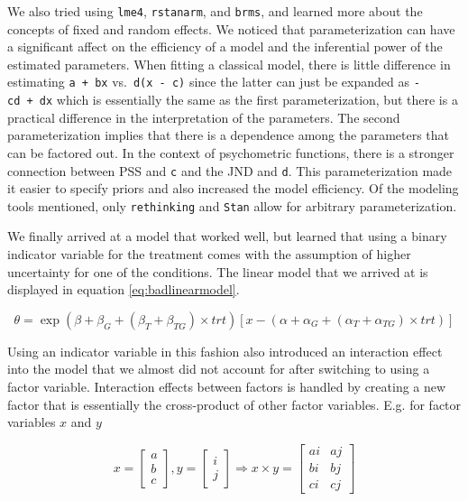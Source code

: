 \documentclass[11pt, oneside, openany]{scrbook}
\begin{document}
We also tried using \texttt{lme4}, \texttt{rstanarm}, and \texttt{brms}, and learned more about the concepts of fixed and random effects. We noticed that parameterization can have a significant affect on the efficiency of a model and the inferential power of the estimated parameters. When fitting a classical model, there is little difference in estimating \texttt{a\ +\ bx} vs.~\texttt{d(x\ -\ c)} since the latter can just be expanded as \texttt{-cd\ +\ dx} which is essentially the same as the first parameterization, but there is a practical difference in the interpretation of the parameters. The second parameterization implies that there is a dependence among the parameters that can be factored out. In the context of psychometric functions, there is a stronger connection between PSS and \texttt{c} and the JND and \texttt{d}. This parameterization made it easier to specify priors and also increased the model efficiency. Of the modeling tools mentioned, only \texttt{rethinking} and \texttt{Stan} allow for arbitrary parameterization.

We finally arrived at a model that worked well, but learned that using a binary indicator variable for the treatment comes with the assumption of higher uncertainty for one of the conditions. The linear model that we arrived at is displayed in equation \eqref{eq:badlinearmodel}.

\begin{equation}
  \theta = \exp(\beta + \beta_G +(\beta_T + \beta_{TG})\times trt) \left[x - (\alpha + \alpha_G + (\alpha_T + \alpha_{TG})\times trt)\right]
  \label{eq:badlinearmodel}
\end{equation}

Using an indicator variable in this fashion also introduced an interaction effect into the model that we almost did not account for after switching to using a factor variable. Interaction effects between factors is handled by creating a new factor that is essentially the cross-product of other factor variables. E.g. for factor variables \(x\) and \(y\)


\[
x = \begin{bmatrix}
a \\
b \\
c
\end{bmatrix}, y =  \begin{bmatrix}
i \\
j
\end{bmatrix}\Longrightarrow x\times y = 
\begin{bmatrix}
ai & aj \\
bi & bj \\
ci & cj
\end{bmatrix}
\]
\end{document}
